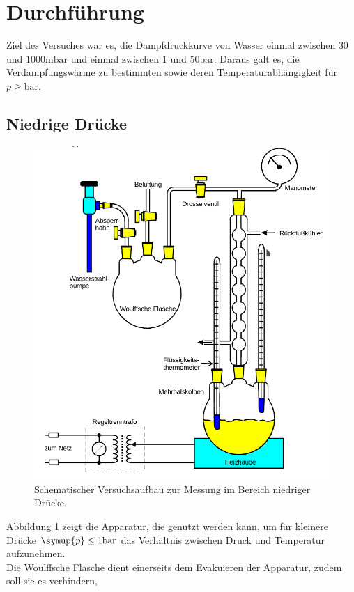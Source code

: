\section{Durchführung}
\label{sec:Durchführung}
Ziel des Versuches war es, die Dampfdruckkurve von Wasser einmal zwischen $30$ und $1000 \si{\milli\bar}$
und einmal zwischen $1$ und $50 \si{\bar}$. Daraus galt es, die Verdampfungswärme zu bestimmten
sowie deren Temperaturabhängigkeit für $p \geq \si{\bar}$.

\subsection{Niedrige Drücke}
\begin{figure}
    \centering
    \includegraphics[width=\textwidth]{apparatur1.png}
    \caption{Schematischer Versuchsaufbau zur Messung im Bereich niedriger Drücke.}
    \label{fig:app1}
\end{figure}
Abbildung \ref{fig:app1} zeigt die Apparatur, die genutzt werden kann, um für kleinere Drücke $\symup{p} \leq 1 \si{\bar}$
das Verhältnis zwischen Druck und Temperatur aufzunehmen. \\
Die Woulffsche Flasche dient einerseits dem Evakuieren der Apparatur, zudem soll sie es verhindern,
